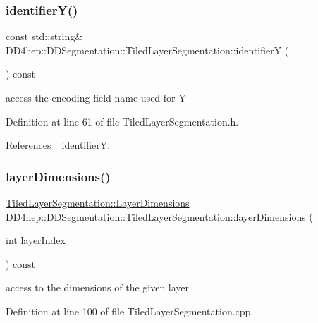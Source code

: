 \subsubsection{\texorpdfstring{identifier\+Y()}{identifierY()}}
{\footnotesize\ttfamily const std\+::string\& D\+D4hep\+::\+D\+D\+Segmentation\+::\+Tiled\+Layer\+Segmentation\+::identifierY (\begin{DoxyParamCaption}{ }\end{DoxyParamCaption}) const\hspace{0.3cm}{\ttfamily [inline]}}



access the encoding field name used for Y 



Definition at line 61 of file Tiled\+Layer\+Segmentation.\+h.



References \+\_\+identifierY.

\hypertarget{class_d_d4hep_1_1_d_d_segmentation_1_1_tiled_layer_segmentation_a815d2b95bc2d5a3efceb9f4ad96df7ad}{}\label{class_d_d4hep_1_1_d_d_segmentation_1_1_tiled_layer_segmentation_a815d2b95bc2d5a3efceb9f4ad96df7ad} 
\subsubsection{\texorpdfstring{layer\+Dimensions()}{layerDimensions()}}
{\footnotesize\ttfamily \hyperlink{struct_d_d4hep_1_1_d_d_segmentation_1_1_tiled_layer_segmentation_1_1_layer_dimensions}{Tiled\+Layer\+Segmentation\+::\+Layer\+Dimensions} D\+D4hep\+::\+D\+D\+Segmentation\+::\+Tiled\+Layer\+Segmentation\+::layer\+Dimensions (\begin{DoxyParamCaption}\item[{int}]{layer\+Index }\end{DoxyParamCaption}) const}



access to the dimensions of the given layer 



Definition at line 100 of file Tiled\+Layer\+Segmentation.\+cpp.



